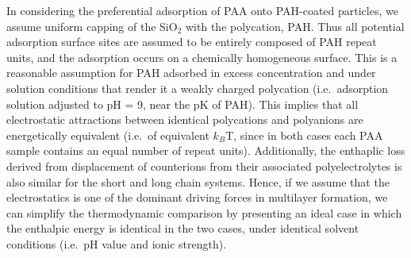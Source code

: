 \documentclass[journal=mamobx,manuscript=article]{achemso}
\begin{document}
In considering the preferential adsorption of PAA onto PAH-coated particles, we assume uniform capping of the SiO$_2$ with the polycation, PAH.  Thus all potential adsorption surface sites are assumed to be entirely composed of PAH repeat units, and the adsorption occurs on a chemically homogeneous surface.  This is a reasonable assumption for PAH adsorbed in excess concentration and under solution conditions that render it a weakly charged polycation (i.e.\ adsorption solution adjusted to pH = 9, near the pK of PAH).\cite{Burke2003,Smith2003}  This implies that all electrostatic attractions between identical polycations and polyanions are energetically equivalent (i.e.\ of equivalent $k_B$T, since in both cases each PAA sample contains an equal number of repeat units).\cite{Dubas1999}  Additionally, the enthaplic loss derived from displacement of counterions from their associated polyelectrolytes is also similar for the short and long chain systems.  Hence, if we assume that the electrostatics is one of the dominant driving forces in multilayer formation, we can simplify the thermodynamic comparison by presenting an ideal case in which the enthalpic energy is identical in the two cases, under identical solvent conditions (i.e.\ pH value and ionic strength). 
\end{document}
